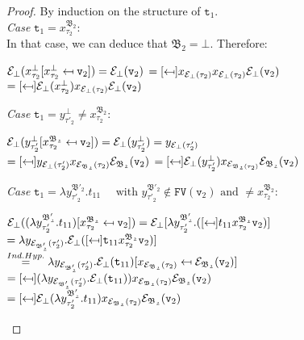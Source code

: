 \begin{proof}
By induction on the structure of $\texttt{t}_{1}$.  \\

\noindent\textit{Case} 
$\texttt{t}_{1} = x^{\mathfrak{B_{2}}}_{\tau_{2}}$:\\
In that case,  we can deduce that $\mathfrak{B_{2}} = \bot$. Therefore:

\begin{center}
 $\mathcal{E}_{\bot}
	(x^{\bot}_{\tau_{2}} [x^{\bot}_{\tau_{2}} \mapsfrom \texttt{v}_{2}]) 
	= \mathcal{E}_{\bot}(\texttt{v}_{2}) $ 
	$= \sbst
			{x_{\e_{\bot}(\tau_{2})}}
			{x_{\e_{\bot}(\tau_{2})}}
			{\e_{\bot}(\texttt{v}_{2})}$ \\[0.08cm]
	$= \sbst
			{\e_{\bot}(x^{\bot}_{\tau_{2}})}
			{x_{\e_{\bot}(\tau_{2})}}
			{\e_{\bot}(\texttt{v}_{2})}$
\end{center}

\noindent\textit{Case} $
\texttt{t}_{1} = y^{\bot}_{\tau'_{2}} \neq x^{\mathfrak{B_{2}}}_{\tau_{2}}$:
\begin{center}
 $\mathcal{E}_{\bot}
	(y^{\bot}_{\tau'_{2}} [x^{\mathfrak{B_{2}}}_{\tau_{2}} \mapsfrom \texttt{v}_{2}]) 
	= \mathcal{E}_{\bot}(y^{\bot}_{\tau'_{2}}) 
	= y_{\mathcal{E}_{\bot}(\tau'_{2})} $ \\[0.08cm]
$ = \sbst
			{y_{\e_{\bot}(\tau'_{2})}}
			{x_{\e_{\mathfrak{B_{2}}}(\tau_{2})}}
			{\e_{\mathfrak{B_{2}}}(\texttt{v}_{2})}$ 
$ = \sbst
			{\e_{\bot}(y^{\bot}_{\tau'_{2}})}
			{x_{\e_{\mathfrak{B_{2}}(\tau_{2})}}}
			{\e_{\mathfrak{B_{2}}}(\texttt{v}_{2})}$
\end{center}

\noindent\textit{Case} 
$\texttt{t}_{1} 
= \lambda y^{\mathfrak{B'_{2}}}_{\tau'_{2}}. t_{11} \quad \text{ with }   
y^{\mathfrak{B'_{2}}}_{\tau'_{2}} \not\in \texttt{FV}(\texttt{v}_{2}) 
\text{ and } \neq x^{\mathfrak{B_{2}}}_{\tau_{2}} : $
\begin{center}
 $\e_{\bot}
	(\sbst
		{(\lambda y^{\mathfrak{B'_{2}}}_{\tau'_{2}}. t_{11})}
		{x^{\mathfrak{B_{2}}}_{\tau_{2}}}
		{\texttt{v}_{2}})
	= \e_{\bot}[\lambda y^{\mathfrak{B'_{2}}}_{\tau'_{2}}.
	(\sbst
		{ t_{11}}
		{x^{\mathfrak{B_{2}}}_{\tau_{2}}}
		{\texttt{v}_{2}})] $\\[0.08cm]
$	= \lambda y_{\e_{\mathfrak{B'_{2}}}(\tau'_{2})}.
		\e_{\bot}(
		\sbst
			{\texttt{t}_{11}}
			{x^{\mathfrak{B_{2}}}_{\tau_{2}}}
			{\texttt{v}_{2}})] $\\[0.08cm]
$ \stackrel{Ind.Hyp.}{=} 
	\lambda y_{\mathcal{E}_{\mathfrak{B'_{2}}}(\tau'_{2})}.		
	\mathcal{E}_{\bot}(\texttt{t}_{11}) [x_{\mathcal{E}_{\mathfrak{B_{2}}}(\tau_{2})} \mapsfrom \mathcal{E}_{\mathfrak{B_{2}}}(\texttt{v}_{2})]$ \\[0.08cm]
$	= \sbst
			{(\lambda y_{\e_{\mathfrak{B'_{2}}}(\tau'_{2})}.
				\e_{\bot}(\texttt{t}_{11}))}
			{x_{\e_{\mathfrak{B_{2}}}(\tau_{2})}}
			{\e_{\mathfrak{B_{2}}}(\texttt{v}_{2})}$ \\[0.08cm]
$ = 
	\sbst
			{\e_{\bot}(\lambda y^{\mathfrak{B'_{2}}}_{\tau'_{2}}. t_{11}) }
			{x_{\e_{\mathfrak{B_{2}}}(\tau_{2})}}
			{\e_{\mathfrak{B_{2}}}(\texttt{v}_{2})}$
\end{center}


\end{proof}
